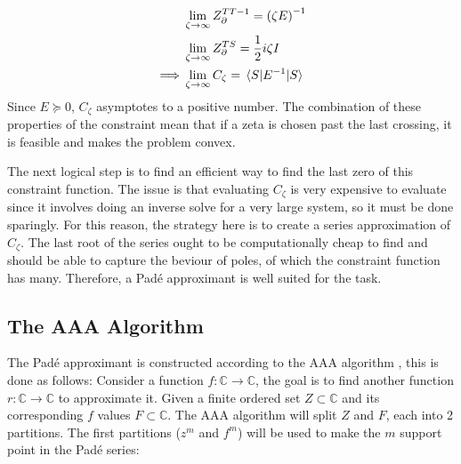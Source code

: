 \documentclass[reprint]{revtex4-2}
\begin{document}
\begin{align}
	&\lim_{\zeta\rightarrow\infty}Z^{TT-1}_\partial = \qty(\zeta E)^{-1}\\
	&\lim_{\zeta\rightarrow\infty}Z^{TS}_\partial = \frac{1}{2}i\zeta I \notag\\
	\implies&\lim_{\zeta\rightarrow\infty} C_\zeta = \ev{E^{-1}}{S}\notag
\end{align}
Since $E\succcurlyeq0$, $C_\zeta$ asymptotes to a positive number. The combination of these properties of the constraint mean that if a zeta is chosen past the last crossing, it is feasible and makes the problem convex.

The next logical step is to find an efficient way to find the last zero of this constraint function. The issue is that evaluating $C_\zeta$ is very expensive to evaluate since it involves doing an inverse solve for a very large system, so it must be done sparingly. For this reason, the strategy here is to create a series approximation of $C_\zeta$. The last root of the series ought to be computationally cheap to find and should be able to capture the beviour of poles, of which the constraint function has many. Therefore, a Padé approximant is well suited for the task.

\subsection{The AAA Algorithm}
The Padé approximant is constructed according to the AAA algorithm \cite{nakatsukasa2018aaa}, this is done as follows: Consider a function $f:\mathbb{C}\rightarrow\mathbb{C}$, the goal is to find another function $r:\mathbb{C}\rightarrow\mathbb{C}$ to approximate it. Given a finite ordered set $Z\subset\mathbb{C}$ and its corresponding $f$ values $F\subset\mathbb{C}$. The AAA algorithm will split $Z$ and $F$, each into 2 partitions. The first partitions ($z^m$ and $f^m$) will be used to make the $m$ support point in the Padé series:
\end{document}
